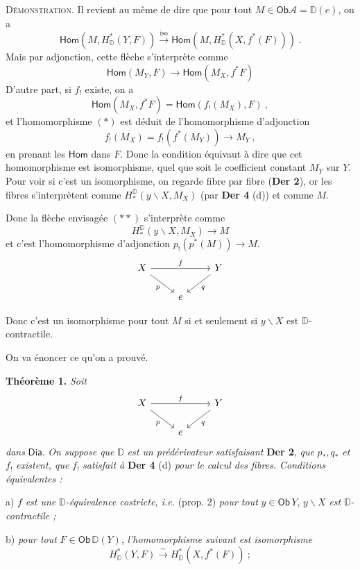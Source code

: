 \documentclass[11pt,leqno]{article}
\newcommand{\printedpage}[1]{\marginpar{\footnotesize p.~#1}}
\newcommand{\msp}[1]{\marginpar{\footnotesize [#1]}}
\newcommand{\DD}{\mathbb{D}}
\newcommand{\cA}{\mathcal{A}}
\newcommand{\Dia}{\mathsf{Dia}}
\newcommand{\Ob}{\mathsf{Ob}}
\newcommand{\Hom}{\mathsf{Hom}}
\newcommand{\isoto}{\overset{\sim}{\to}}
\newcommand{\D}{\mathbb{D}}
\begin{document}
\noindent\textsc{Démonstration}. Il revient au même de dire que pour tout $M \in \Ob \cA = \DD(e)$, on a
\[
\Hom(M, H^*_{\DD}(Y, F)) \overset{\mathrm{iso}}{\longrightarrow} \Hom(M, H^*_{\DD}(X, f^*(F))) \ .
\]
Mais par adjonction, cette flèche s'interprète comme
\[
\Hom(M_Y, F) \longrightarrow \Hom(M_X, f^*F) \tag*{$(*)$}
\]
D'autre part, si $f_!$ existe, on a
\[
\Hom(M_X, f^*F) = \Hom(f_!(M_X), F) \ ,
\]
et l'homomorphisme $(*)$ est déduit de l'homomorphisme d'adjonction
\[
f_!(M_X) = f_!(f^*(M_Y)) \longrightarrow M_Y \ , \tag*{$(**)$}
\]
en prenant les $\Hom$ dans $F$. Donc la condition équivaut à dire que cet homomorphisme est isomorphisme, quel que soit le coefficient constant $M_Y$ sur $Y$. Pour voir si c'est un isomorphisme, on regarde fibre par fibre (\textbf{Der 2}), or les fibres s'interprètent comme $H^{\DD}_*(y\backslash X, M_X)$ (par \textbf{Der 4} (d)) et comme $M$.

\printedpage{39}
\msp{page 67}

\noindent Donc la flèche envisagée $(**)$ s'interprète comme
\[
H_*^{\D}(y\backslash X, M_X) \longrightarrow M
\]
et c'est l'homomorphisme d'adjonction $p_!(p^*(M)) \to M$.
\[
\begin{tikzcd}
X \arrow[rr, "f"] \arrow[dr, "p"{swap}] & & Y \arrow[dl, "q"] \\
& e &
\end{tikzcd}
\]

\noindent Donc c'est un isomorphisme pour tout $M$ si et seulement si $y\backslash X$ est $\D$-contractile.

\noindent On va énoncer ce qu'on a prouvé.

\noindent\textbf{Théorème 1.} \textit{Soit}
\[
\begin{tikzcd}
X \arrow[rr, "f"] \arrow[dr, "p"{swap}] & & Y \arrow[dl, "q"] \\
& e &
\end{tikzcd}
\]
\textit{dans} $\Dia$. \textit{On suppose que} $\D$ \textit{est un prédérivateur satisfaisant} \textbf{Der 2}, \textit{que} $p_*, q_*$ \textit{et} $f_!$ \textit{existent, que} $f_!$ \textit{satisfait à} \textbf{Der 4} (d) \textit{pour le calcul des fibres. Conditions équivalentes :}

a) $f$ \textit{est une} $\D$\textit{-équivalence costricte, i.e.} (prop. 2) \textit{pour tout} $y \in \Ob\, Y$, $y\backslash X$ \textit{est} $\D$\textit{-contractile ;}

b) \textit{pour tout} $F \in \Ob\, \D(Y)$, \textit{l'homomorphisme suivant est} \textit{isomorphisme}
\[
H^*_{\D}(Y, F) \isoto H^*_{\D}(X, f^*(F)) \ ;
\]
\end{document}
